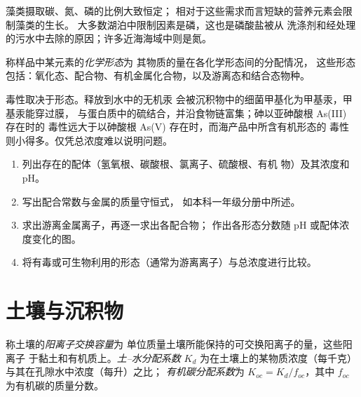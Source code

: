 藻类摄取碳、氮、磷的比例大致恒定；
相对于这些需求而言短缺的营养元素会限制藻类的生长。
大多数湖泊中限制因素是磷，这也是磷酸盐被从
洗涤剂和经处理的污水中去除的原因；许多近海海域中则是氮。

\begin{definition}[化学形态]\label{def:b3:environmental-toxicology:speciation}
称样品中某元素的\emph{化学形态}为
其物质的量在各化学形态间的分配情况，
这些形态包括：氧化态、配合物、有机金属化合物，以及游离态和结合态物种。
\end{definition}

毒性取决于形态。释放到水中的无机汞
会被沉积物中的细菌甲基化为甲基汞，甲基汞能穿过膜，
与蛋白质中的硫结合，并沿食物链富集；砷以亚砷酸根 As(III) 存在时的
毒性远大于以砷酸根 As(V) 存在时，而海产品中所含有机形态的
毒性则小得多。仅凭总浓度难以说明问题。

\begin{method}[水体中金属的化学形态分析]\label{met:b3:environmental-toxicology:speciation}
\begin{enumerate}
  \item 列出存在的配体（氢氧根、碳酸根、氯离子、硫酸根、有机
        物）及其浓度和 pH。
  \item 写出配合常数与金属的质量守恒式，
        如本科一年级分册中所述。
  \item 求出游离金属离子，再逐一求出各配合物；
        作出各形态分数随 pH 或配体浓度变化的图。
  \item 将有毒或可生物利用的形态（通常为游离离子）与总浓度进行比较。
\end{enumerate}
\end{method}

\section{土壤与沉积物}

\begin{definition}[土壤中的吸附]\label{def:b3:environmental-toxicology:soil}
称土壤的\emph{阳离子交换容量}为
单位质量土壤所能保持的可交换阳离子的量，这些阳离子
于黏土和有机质上。\emph{土–水分配系数}
$K_d$ 为在土壤上的某物质浓度（每千克）
与其在孔隙水中浓度（每升）之比；
\emph{有机碳分配系数}为
$K_{oc} = K_d/f_{oc}$，其中 $f_{oc}$ 为有机碳的质量分数。
\end{definition}

